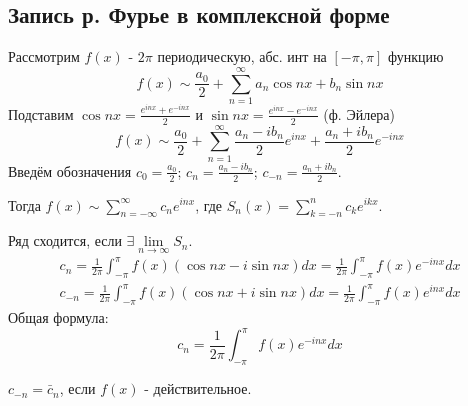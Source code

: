 \documentclass{article}
\begin{document}
\subsection{Запись р. Фурье в комплексной форме}
Рассмотрим $f(x)$ - $2\pi$ периодическую, абс. инт на $[-\pi,\pi]$ функцию
\[
  f(x) \sim \frac{a_0}{2}+\sum_{n=1}^{\infty}a_n\cos nx + b_n\sin nx
\]
Подставим $\cos nx =\frac{e^{inx}+e^{-inx}}{2}$ и $\sin nx = \frac{e^{inx}-e^{-inx}}{2}$ (ф. Эйлера)
\[
  f(x)\sim \frac{a_0}{2}+\sum_{n=1}^{\infty}\frac{a_n-ib_n}{2}e^{inx}+\frac{a_n+ib_n}{2}e^{-inx}
\]
Введём обозначения $c_0=\frac{a_{0}}{2}$; $c_n=\frac{a_n-ib_n}{2}$; $c_{-n}=\frac{a_n+ib_n}{2}$.

Тогда $f(x)\sim \sum_{n=-\infty}^{\infty}c_ne^{inx}$, где $S_n(x)=\sum_{k=-n}^{n}c_ke^{ikx}$.

Ряд сходится, если $\exists\lim \limits_{n\to\infty}S_n$.
\begin{gather*}
  c_n = \frac{1}{2\pi}\int_{-\pi}^{\pi}f(x)(\cos nx - i \sin nx)dx 
  = \frac{1}{2\pi}\int_{-\pi}^{\pi}f(x)e^{-inx}dx \\ 
  c_{-n}=\frac{1}{2\pi} \int_{-\pi}^{\pi}f(x)(\cos nx + i\sin nx)dx 
  = \frac{1}{2\pi}\int_{-\pi}^{\pi}f(x)e^{inx}dx
\end{gather*}
Общая формула:
\[
  c_n=\frac{1}{2\pi}\int_{-\pi}^{\pi}f(x)e^{-inx}dx
\]
\begin{remark}
  $c_{-n}=\bar{c}_n$, если $f(x)$ - действительное.
\end{remark}
\end{document}
